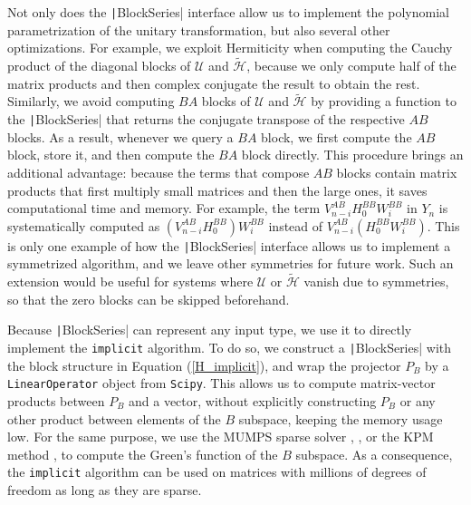 Not only does the \texttt|BlockSeries| interface allow us to
implement the polynomial parametrization of the unitary transformation, but
also several other optimizations.
For example, we exploit Hermiticity when computing the Cauchy product of the
diagonal blocks of $\mathcal{U}$ and $\tilde{\mathcal{H}}$, because we only
compute half of the matrix products and then complex conjugate the result to
obtain the rest.
Similarly, we avoid computing $BA$ blocks of $\mathcal{U}$ and
$\tilde{\mathcal{H}}$ by providing a function to the \texttt|BlockSeries| that returns
the conjugate transpose of the respective $AB$ blocks.
As a result, whenever we query a $BA$ block, we first compute the $AB$ block,
store it, and then compute the $BA$ block directly.
This procedure brings an additional advantage: because the terms that compose
$AB$ blocks contain matrix products that first multiply small matrices and then
the large ones, it saves computational time and memory.
For example, the term $V_{n -i}^{AB} H_0^{BB}
W_i^{BB}$ in $Y_n$ is systematically computed as $(V_{n -i}^{AB}
H_0^{BB}) W_i^{BB}$ instead of $V_{n -i}^{AB}
(H_0^{BB} W_i^{BB})$.
This is only one example of how the \texttt|BlockSeries| interface allows us to
implement a symmetrized algorithm, and we leave other symmetries for future
work.
Such an extension would be useful for systems where $\mathcal{U}$ or
$\tilde{\mathcal{H}}$ vanish due to symmetries, so that the zero blocks can be
skipped beforehand.

Because \texttt|BlockSeries| can represent any input type, we use
it to directly implement the \texttt{implicit} algorithm.
To do so, we construct a \texttt|BlockSeries| with the block structure in Equation
(\ref{H_implicit}), and wrap the projector $P_B$ by a \texttt{LinearOperator} object
from \texttt{Scipy}.
This allows us to compute matrix-vector products between $P_B$ and a vector,
without explicitly constructing $P_B$ or any other product between elements of
the $B$ subspace, keeping the memory usage low.
For the same purpose, we use the MUMPS sparse solver
\cite{Amestoy_2001},
\cite{Amestoy_2006}, or the KPM method
\cite{Wei_e_2006}, to compute the Green's function of the
$B$ subspace.
As a consequence, the \texttt{implicit} algorithm can be used on matrices with
millions of degrees of freedom as long as they are sparse.

